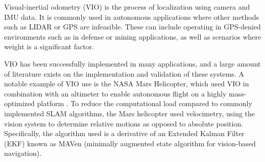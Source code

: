 \documentclass[bare_jrnl_transmag]{subfiles}
\begin{document}
Visual-inertial odometry (VIO) is the process of localization using camera and IMU data. It is commonly used in autonomous applications where other methods such as LIDAR or GPS are infeasible. These can include operating in GPS-denied environments such as in defense or mining applications, as well as scenarios where weight is a significant factor. 

VIO has been successfully implemented in many applications, and a large amount of literature exists on the implementation and validation of these systems. A notable example of VIO use is the NASA Mars Helicopter, which used VIO in combination with an altimeter to enable autonomous flight on a highly mass-optimized platform \cite{mars_paper}. To reduce the computational load compared to commonly implemented SLAM algorithms, the Mars helicopter used velocimetry, using the vision system to determine relative motions as opposed to absolute position. Specifically, the algorithm used is a derivative of an Extended Kalman Filter (EKF) known as MAVen (minimally augmented state algorithm for vision-based navigation). 
\end{document}
